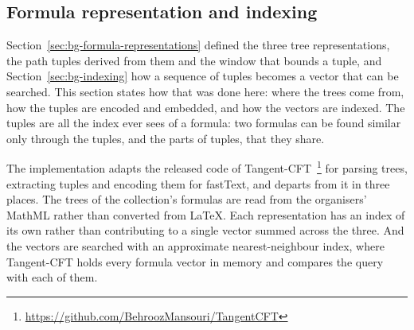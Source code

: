 \subsection{Formula representation and indexing}\label{sec:met-formula-indexing}

Section~\ref{sec:bg-formula-representations} defined the three tree representations, the
path tuples derived from them and the window that bounds a tuple, and
Section~\ref{sec:bg-indexing} how a sequence of tuples becomes a vector that can be searched.
This section states how that was done here: where the trees come from, how the tuples are
encoded and embedded, and how the vectors are indexed. The tuples are all the index ever sees
of a formula: two formulas can be found similar only through the tuples, and the parts of
tuples, that they share.

The implementation adapts the released code of
Tangent-CFT~\cite{mansouri2019tangentcft}\footnote{\url{https://github.com/BehroozMansouri/TangentCFT}}
for parsing trees, extracting tuples and encoding them for fastText, and departs from it in
three places. The trees of the collection's formulas are read from the organisers' MathML
rather than converted from \LaTeX{}. Each representation has an index of its own rather than
contributing to a single vector summed across the three. And the vectors are searched with an
approximate nearest-neighbour index, where Tangent-CFT holds every formula vector in memory
and compares the query with each of them.

